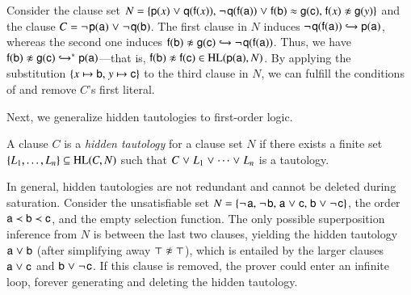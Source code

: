 \begin{exa}
   \label{example:unithle}
   Consider the clause set $N = \{\cst{p}(x) \cor \cst{q}(\cst{f}(x)){,}\;
   \neglit{\cst{q}(\cst{f}(\cst{a}))} \cor \eqlit{\cst{f}(\cst{b})}{\cst{g}(\cst{c})}{,}\;
   \neqlit{\cst{f}(x)}{\cst{g}(y)}\}$ and the clause $C = \neglit{\cst{p}(\cst{a})} \cor
   \neglit{\cst{q}(\cst{b})}$. The first clause in $N$ induces
   $\neglit{\cst{q}(\cst{f}(\cst{a}))} \bigfimpl{N} \cst{p}(\cst{a})$, whereas
   the second one induces $\neqlit{\cst{f}(\cst{b})}{\cst{g}(\cst{c})} \bigfimpl{N}
   \neglit{\cst{q}(\cst{f}(\cst{a}))}$. Thus, we have $\neqlit{\cst{f}(\cst{b})}{\cst{g}(\cst{c})}
   \bigfimpl{N}^\ast \cst{p}(\cst{a})$---that is, $\neqlit{\cst{f}(\cst{b})}{\cst{f}(\cst{c})} \in
   \HL(\cst{p}(\cst{a}), N)$. By applying the substitution $\{x \mapsto \cst{b}{,}\allowbreak\; y
   \mapsto \cst{c}\}$ to the third clause in $N$, we can fulfill the conditions of
    and remove $C$'s first literal.
\end{exa}

Next, we generalize hidden tautologies to first-order logic.

\begin{defi}
   A clause $C$ is a \emph{hidden tautology} for a clause set $N$ if there
   exists a finite set $\{L_1,\dots,L_n\} \subseteq \HL(C,N)$ such that
   $C \cor L_1 \cor \cdots \cor L_n$ is a tautology.
\end{defi}

\begin{exa}
   \label{example:hidden-tautologies-completeness}
   In general, hidden tautologies are not redundant and cannot be deleted during saturation.
   Consider the unsatisfiable set $N = \{ \negpredlit{\cst{a}}{,}\;
   \negpredlit{\cst{b}}{,}\; \pospredlit{\cst{a}} \cor
   \pospredlit{\cst{c}}{,}\allowbreak\; \pospredlit{\cst{b}} \cor \negpredlit{\cst{c}}
   \}$, the order $\cst{a} \prec
   \cst{b} \prec \cst{c}$, and the empty selection function. The
   only possible superposition inference from $N$ is between the last two clauses,
   yielding the hidden tautology $\pospredlit{\cst{a}} \cor \pospredlit{\cst{b}}$
   (after simplifying away $\neqlit{\top}{\top}$), which is entailed by the larger
   clauses $\pospredlit{\cst{a}} \cor \pospredlit{\cst{c}}$ and
   $\pospredlit{\cst{b}} \cor \negpredlit{\cst{c}}$. If this clause is removed,
   the prover could enter an infinite loop, forever generating and deleting the
   hidden tautology.
\end{exa}

